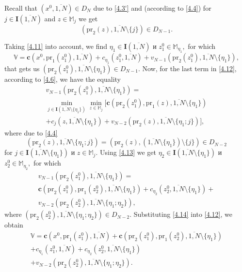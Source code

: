 \documentclass[10pt]{article}
\begin{document}
Recall that
$(x^0,\overline{1,N}) \in D_N$
due to \eqref{4.3'}
and
(according to \eqref{4.4})
for
$j \in \mathbf{I}(\overline{1,N})$
and
$z \in \mathbb{M}_j$
we get
$$
  (\mathrm{pr}_2(z),\overline{1,N} \setminus \{j\}) \in D_{N-1}
  .
$$

Taking \eqref{4.11} into account, we find
$\eta_1 \in \mathbf{I}(\overline{1,N})$ и $z_1^0 \in \mathbb{M}_{\eta_1},$
for which
\begin{equation}\label{4.12}
  \mathbb{V} = \mathbf{c}(x^0,\mathrm{pr}_1(z_1^0),\overline{1,N}) +
  c_{\eta_1}(z_1^0,\overline{1,N}) +
  v_{N-1}(\mathrm{pr}_2(z_1^0),\overline{1,N} \setminus \{\eta_1\}),
\end{equation}
that gets us
$(\mathrm{pr}_2(z_1^0),\overline{1,N} \setminus \{\eta_1\}) \in D_{N-1}$.
Now,
for the last term in \eqref{4.12},
according to \eqref{4.6},
we have the equality
\begin{multline}
  \label{4.13}
  v_{N-1}(\mathrm{pr}_2(z_1^0),\overline{1,N}  \setminus \{\eta_1\}) =
  \\
  \min\limits_{j \in \mathbf{I}(\overline{1,N} \setminus \{\eta_1\})}
  \min\limits_{z \in \mathbb{M}_j}
  \big [
    \mathbf{c}(\mathrm{pr}_2(z_1^0),\mathrm{pr}_1(z),\overline{1,N} \setminus \{\eta_1\})
    \\
    + c_j(z,\overline{1,N} \setminus \{\eta_1\}) +
    v_{N-2}(\mathrm{pr}_2(z),\overline{1,N} \setminus \{\eta_1;j\})
  \big ],
\end{multline}
where due to
\eqref{4.4}
$$
(\mathrm{pr}_2(z),\overline{1,N} \setminus \{\eta_1;j\}) =
(\mathrm{pr}_2(z),(\overline{1,N} \setminus \{\eta_1\}) \setminus \{j\}) \in D_{N-2}
$$
for
$j \in \mathbf{I}(\overline{1,N} \setminus \{\eta_1\})$ и $z \in \mathbb{M}_j.$
Using \eqref{4.13}
we get
$\eta_2 \in \mathbf{I}(\overline{1,N} \setminus \{\eta_1\})$ и $z_2^0 \in \mathbb{M}_{\eta_2},$
for which
\begin{multline}
  \label{4.14}
  v_{N-1}(\mathrm{pr}_2(z_1^0),\overline{1,N} \setminus \{\eta_1\}) =
  \\
  \mathbf{c}(\mathrm{pr}_2(z_1^0),\mathrm{pr}_1(z_2^0),\overline{1,N}
  \setminus \{\eta_1\}) + c_{\eta_2}(z_2^0,\overline{1,N}
  \setminus \{\eta_1\})
  + \\
  v_{N-2}(\mathrm{pr}_2(z_2^0),\overline{1,N} \setminus
  \{\eta_1;\eta_2\}),
\end{multline}
where
$(\mathrm{pr}_2(z_2^0),\overline{1,N} \setminus \{\eta_1;\eta_2\}) \in D_{N-2}.$
Substituting \eqref {4.14} into \eqref {4.12}, we obtain
\begin{equation}\label{4.15}
  \begin{array}{c}
    \mathbb{V} =
    \mathbf{c}(x^0,\mathrm{pr}_1(z_1^0),\overline{1,N}) +
    \mathbf{c}(\mathrm{pr}_2(z_1^0),\mathrm{pr}_1(z_2^0),\overline{1,N} \setminus \{\eta_1\})\\
    + c_{\eta_1}(z_1^0,\overline{1,N}) + c_{\eta_2}(z_2^0,\overline{1,N} \setminus \{\eta_1\})
    \\
    + v_{N-2}(\mathrm{pr}_2(z_2^0),\overline{1,N} \setminus \{\eta_1;\eta_2\}).
  \end{array}
\end{equation}
\end{document}
